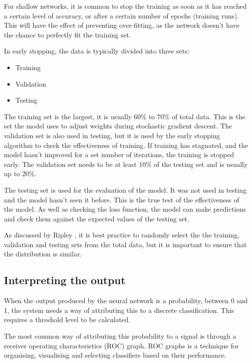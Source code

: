 For shallow networks, it is common to stop the training as soon as it has reached a certain level of accuracy, or after a certain number of epochs (training runs)\cite{Caudill_nn_primer}. This will have the effect of preventing over-fitting, as the network doesn't have the chance to perfectly fit the training set.

In early stopping, the data is typically divided into three sets\cite{girosi_neural}:
\begin{itemize}
    \item Training
    \item Validation
    \item Testing
\end{itemize}{}

The training set is the largest, it is usually 60\% to 70\% of total data. This is the set the model uses to adjust weights during stochastic gradient descent. The validation set is also used in testing, but it is used by the early stopping algorithm to check the effectiveness of training. If training has stagnated, and the model hasn't improved for a set number of iterations, the training is stopped early\cite{chollet2015keras}. The validation set needs to be at least 10\% of the testing set and is usually up to 20\%.

The testing set is used for the evaluation of the model. It was not used in testing and the model hasn't seen it before. This is the true test of the effectiveness of the model\cite{Prechelt97earlystopping}. As well as checking the loss function, the model can make predictions and check them against the expected values of the testing set.

As discussed by Ripley \cite{ripley2007pattern}, it is best practice to randomly select the the training, validation and testing sets from the total data, but it is important to ensure that the distribution is similar.

\subsection{Interpreting the output}

When the output produced by the neural network is a probability, between 0 and 1, the system needs a way of attributing this to a discrete classification. This requires a threshold level to be calculated.

The most common way of attributing this probability to a signal is through a receiver operating characteristics (ROC) graph\cite{Fawcett_threshold}. ROC graphs is a technique for organising, visualising and selecting classifiers based on their performance.

